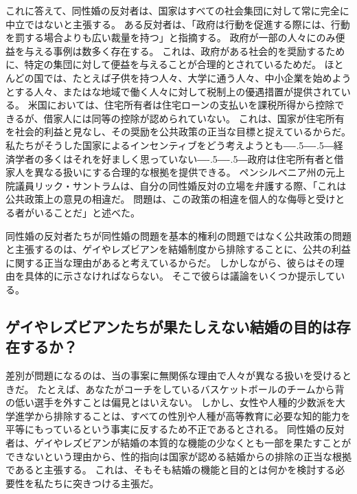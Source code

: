 \documentclass[paper=a4,book,openany]{jlreq}
\def\DDASH{―\kern-.5\zw―\kern-.5\zw―} %
\begin{document}
これに答えて、同性婚の反対者は、国家はすべての社会集団に対して常に完全に中立ではないと主張する。
ある反対者は、「政府は行動を促進する際には、行動を罰する場合よりも広い裁量を持つ」と指摘する\citep[p.607]{dent99:_defen_tradit_marriag}。
政府が一部の人々にのみ便益を与える事例は数多く存在する。
これは、政府がある社会的を奨励するために、特定の集団に対して便益を与えることが合理的とされているためだ。
ほとんどの国では、たとえば子供を持つ人々、大学に通う人々、中小企業を始めようとする人々、またはな地域で働く人々に対して税制上の優遇措置が提供されている。
米国においては、住宅所有者は住宅ローンの支払いを課税所得から控除できるが、借家人には同等の控除が認められていない。
これは、国家が住宅所有を社会的利益と見なし、その奨励を公共政策の正当な目標と捉えているからだ。
私たちがそうした国家によるインセンティブをどう考えようとも{\DDASH}経済学者の多くはそれを好ましく思っていない{\DDASH}政府は住宅所有者と借家人を異なる扱いにする合理的な根拠を提供できる。
ペンシルベニア州の元上院議員リック・サントラムは、自分の同性婚反対の立場を弁護する際、「これは公共政策上の意見の相違だ。
問題は、この政策の相違を個人的な侮辱と受けとる者がいることだ」と述べた\citep{villalva12:_gay_activ_rebuk_bully_santor}。

同性婚の反対者たちが同性婚の問題を基本的権利の問題ではなく公共政策の問題と主張するのは、ゲイやレズビアンを結婚制度から排除することに、公共の利益に関する正当な理由があると考えているからだ。
しかしながら、彼らはその理由を具体的に示さなければならない。
そこで彼らは議論をいくつか提示している。

\subsection{ゲイやレズビアンたちが果たしえない結婚の目的は存在するか？}

差別が問題になるのは、当の事案に無関係な理由で人々が異なる扱いを受けるときだ。
たとえば、あなたがコーチをしているバスケットボールのチームから背の低い選手を外すことは偏見とはいえない。
しかし、女性や人種的少数派を大学進学から排除することは、すべての性別や人種が高等教育に必要な知的能力を平等にもっているという事実に反するため不正であるとされる。
同性婚の反対者は、ゲイやレズビアンが結婚の本質的な機能の少なくとも一部を果たすことができないという理由から、性的指向は国家が認める結婚からの排除の正当な根拠であると主張する。
これは、そもそも結婚の機能と目的とは何かを検討する必要性を私たちに突きつける主張だ。
\end{document}

